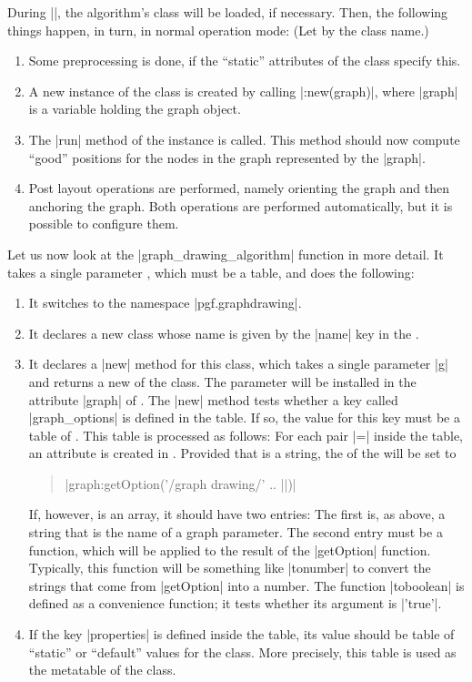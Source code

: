 During |\pgfgdendscope|, the algorithm's class will be loaded, if
necessary. Then, the following things happen, in turn, in normal
operation mode: (Let  by the class name.)

\begin{enumerate}
\item Some preprocessing is done, if the ``static'' attributes of the
  class specify this.
\item A new instance of the class is created by calling
  |:new(graph)|, where |graph| is a variable holding the
  graph object. 
\item The |run| method of the instance is called. This method should now
  compute ``good'' positions for the nodes in the graph represented by
  the |graph|.
\item Post layout operations are performed, namely orienting the
  graph and then anchoring the graph. Both operations are performed
  automatically, but it is possible to configure them.
\end{enumerate}

Let us now look at the |graph_drawing_algorithm| function in more
detail. It takes a single parameter , which must be a
table, and does the following:

\begin{enumerate}
\item It switches to the namespace |pgf.graphdrawing|.
\item It declares a new class whose name is given by the |name| key in
  the .
\item It declares a |new| method for this class, which takes a single
  parameter |g| and returns a new  of the class. The
  parameter will be installed in the attribute |graph| of
  . The |new| method tests whether a key called
  |graph_options| is defined in the  table. If so, the
  value for this key must be a table of . This table is
  processed as follows: For each pair  |=| 
  inside the  table, an attribute  is created
  in . Provided that  is a string, the
   of the  will be set to
  \begin{quote}
    |graph:getOption('/graph drawing/' .. ||)|
  \end{quote}
  If, however,  is an array, it should have two entries:
  The first is, as above, a string that is the name of a graph
  parameter. The second entry must be a function, which will be
  applied to the result of the |getOption| function. Typically, this
  function will be something like |tonumber| to convert the strings
  that come from |getOption| into a number. The function |toboolean|
  is defined as a convenience function; it tests whether its argument
  is |'true'|.
\item If the key |properties| is defined inside the  table,
  its value should be table of ``static'' or ``default'' values for
  the class. More precisely, this table is used as the metatable of
  the class.
\end{enumerate}

